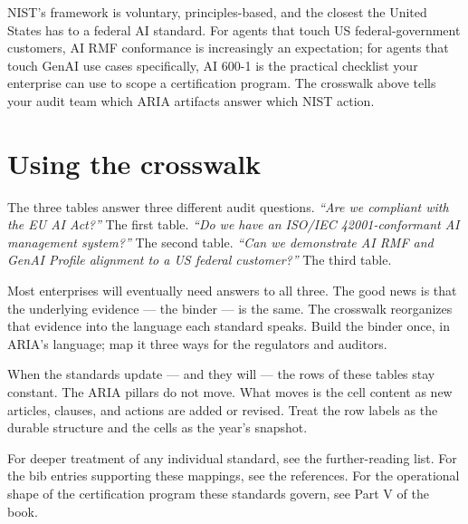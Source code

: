 NIST's framework is voluntary, principles-based, and the closest the United States has to a federal AI standard. For agents that touch US federal-government customers, AI RMF conformance is increasingly an expectation; for agents that touch GenAI use cases specifically, AI 600-1 is the practical checklist your enterprise can use to scope a certification program. The crosswalk above tells your audit team which ARIA artifacts answer which NIST action.
\stoptwocol

\TNrule

\section*{Using the crosswalk}

\starttwocol
The three tables answer three different audit questions. \textit{``Are we compliant with the EU AI Act?''} The first table. \textit{``Do we have an ISO/IEC 42001-conformant AI management system?''} The second table. \textit{``Can we demonstrate AI RMF and GenAI Profile alignment to a US federal customer?''} The third table.

Most enterprises will eventually need answers to all three. The good news is that the underlying evidence --- the binder --- is the same. The crosswalk reorganizes that evidence into the language each standard speaks. Build the binder once, in ARIA's language; map it three ways for the regulators and auditors.

When the standards update --- and they will --- the rows of these tables stay constant. The ARIA pillars do not move. What moves is the cell content as new articles, clauses, and actions are added or revised. Treat the row labels as the durable structure and the cells as the year's snapshot.

For deeper treatment of any individual standard, see the further-reading list. For the bib entries supporting these mappings, see the references. For the operational shape of the certification program these standards govern, see Part V of the book.
\stoptwocol

